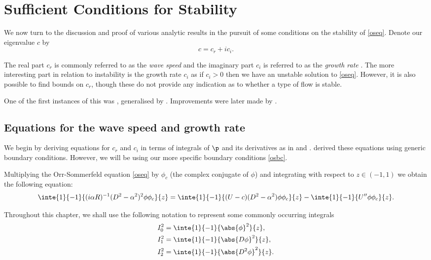 \chapter{Sufficient Conditions for Stability}
\label{chap:suffcons}

We now turn to the discussion and proof of various analytic results in the pursuit of some conditions on the stability of \eqref{oseq}. Denote our eigenvalue $ c $ by
\begin{equation}
    c = c_r + i c_i.
\end{equation}

The real part $ c_r $ is commonly referred to as the \emph{wave speed} and the imaginary part $ c_i $ is referred to as the \emph{growth rate} \citep{drazin2004hydrodynamic}. The more interesting part in relation to instability is the growth rate $ c_i $ as if $ c_i > 0 $ then we have an unstable solution to \eqref{oseq}. However, it is also possible to find bounds on $ c_r $, though these do not provide any indication as to whether a type of flow is stable.

One of the first instances of this was \citet{synge1938hydrodynamical}, generalised by \citet{pai1954generalization}. Improvements were later made by \citet{joseph1968eigenvalue, joseph1969eigenvalue}.

\section{Equations for the wave speed and growth rate}

We begin by deriving equations for $ c_r $ and $ c_i $ in terms of integrals of $ \p $ and its derivatives as in \citet{synge1938hydrodynamical} and \citet{pai1954generalization}. \citet{pai1954generalization} derived these equations using generic boundary conditions. However, we will be using our more specific boundary conditions \eqref{osbc}.

Multiplying the Orr-Sommerfeld equation \eqref{oseq} by $ \phi_c $ (the complex conjugate of $ \phi $) and integrating with respect to $ z \in (-1, 1) $ we obtain the following equation:
\begin{gather}
    \inte{1}{-1}{(i \alpha R)^{-1} (D^2 - \alpha^2)^2 \phi \phi_c}{z}
    = \inte{1}{-1}{(U - c)(D^2 - \alpha^2) \phi \phi_c}{z} - \inte{1}{-1}{U'' \phi \phi_c}{z}.
\label{inteos}
\end{gather}

Throughout this chapter, we shall use the following notation to represent some commonly occurring integrals
\begin{align} 
        I^2_0 &= \inte{1}{-1}{\abs{\phi}^2}{z},\\
        I^2_1 &= \inte{1}{-1} {\abs{D \phi}^2}{z},\\
        I^2_2 &= \inte{1}{-1}{\abs{D^2 \phi}^2}{z}. 
\end{align}

